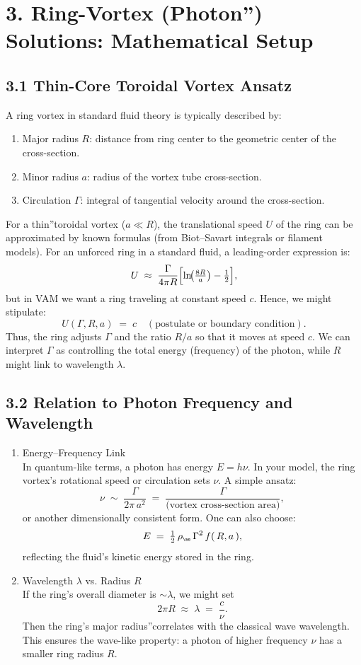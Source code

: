 \section*{3. Ring-Vortex (\grqq Photon\textquotedblright) Solutions: Mathematical Setup}
\subsection*{3.1 Thin-Core Toroidal Vortex Ansatz}
A ring vortex in standard fluid theory is typically described by:
\begin{enumerate}
 \item Major radius \(R\): distance from ring center to the geometric center of the cross-section.
 \item Minor radius \(a\): radius of the vortex tube cross-section.
 \item Circulation \(\Gamma\): integral of tangential velocity around the cross-section.
\end{enumerate}
For a \grqq thin\textquotedblright toroidal vortex (\(a \ll R\)), the translational speed \(U\) of the ring can be approximated by known formulas (from Biot–Savart integrals or filament models). For an unforced ring in a standard fluid, a leading-order expression is:
\[
 U \;\approx\; \frac{\Gamma}{4\pi R} \Bigl[\ln\!\bigl(\tfrac{8R}{a}\bigr) - \tfrac12\Bigr],
\]
but in VAM we want a ring traveling at constant speed \(c\). Hence, we might stipulate:
\[
 U(\Gamma, R, a) \;=\; c \quad (\text{postulate or boundary condition}).
\]
Thus, the ring adjusts \(\Gamma\) and the ratio \(R/a\) so that it moves at speed \(c\). We can interpret \(\Gamma\) as controlling the total energy (frequency) of the photon, while \(R\) might link to wavelength \(\lambda\).

\subsection*{3.2 Relation to Photon Frequency and Wavelength}
\begin{enumerate}
 \item Energy–Frequency Link\\
 In quantum-like terms, a photon has energy \(E = h\nu\). In your model, the ring vortex's rotational speed or circulation sets \(\nu\). A simple ansatz:
 \[
  \nu \;\sim\; \frac{\Gamma}{2\pi\,a^2} \;=\; \frac{\Gamma}{\text{(vortex cross-section area)}},
 \]
 or another dimensionally consistent form. One can also choose:
 \[
  E \;=\; \tfrac12\,\rho_{\scriptscriptstyle \mathrm{\ae}} \,\Gamma^2\,f(\,R,a\,),
 \]
 reflecting the fluid's kinetic energy stored in the ring.

 \item Wavelength \(\lambda\) vs. Radius \(R\)\\
 If the ring's overall diameter is \(\sim \lambda\), we might set
 \[
  2\pi R \;\approx\; \lambda \;=\; \frac{c}{\nu}.
 \]
 Then the ring's \grqq major radius\textquotedblright correlates with the classical wave wavelength. This ensures the wave-like property: a photon of higher frequency \(\nu\) has a smaller ring radius \(R\).
\end{enumerate}

